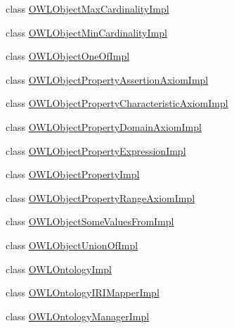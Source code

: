 \begin{DoxyCompactItemize}
\item 
class \hyperlink{classuk_1_1ac_1_1manchester_1_1cs_1_1owl_1_1owlapi_1_1_o_w_l_object_max_cardinality_impl}{O\-W\-L\-Object\-Max\-Cardinality\-Impl}
\item 
class \hyperlink{classuk_1_1ac_1_1manchester_1_1cs_1_1owl_1_1owlapi_1_1_o_w_l_object_min_cardinality_impl}{O\-W\-L\-Object\-Min\-Cardinality\-Impl}
\item 
class \hyperlink{classuk_1_1ac_1_1manchester_1_1cs_1_1owl_1_1owlapi_1_1_o_w_l_object_one_of_impl}{O\-W\-L\-Object\-One\-Of\-Impl}
\item 
class \hyperlink{classuk_1_1ac_1_1manchester_1_1cs_1_1owl_1_1owlapi_1_1_o_w_l_object_property_assertion_axiom_impl}{O\-W\-L\-Object\-Property\-Assertion\-Axiom\-Impl}
\item 
class \hyperlink{classuk_1_1ac_1_1manchester_1_1cs_1_1owl_1_1owlapi_1_1_o_w_l_object_property_characteristic_axiom_impl}{O\-W\-L\-Object\-Property\-Characteristic\-Axiom\-Impl}
\item 
class \hyperlink{classuk_1_1ac_1_1manchester_1_1cs_1_1owl_1_1owlapi_1_1_o_w_l_object_property_domain_axiom_impl}{O\-W\-L\-Object\-Property\-Domain\-Axiom\-Impl}
\item 
class \hyperlink{classuk_1_1ac_1_1manchester_1_1cs_1_1owl_1_1owlapi_1_1_o_w_l_object_property_expression_impl}{O\-W\-L\-Object\-Property\-Expression\-Impl}
\item 
class \hyperlink{classuk_1_1ac_1_1manchester_1_1cs_1_1owl_1_1owlapi_1_1_o_w_l_object_property_impl}{O\-W\-L\-Object\-Property\-Impl}
\item 
class \hyperlink{classuk_1_1ac_1_1manchester_1_1cs_1_1owl_1_1owlapi_1_1_o_w_l_object_property_range_axiom_impl}{O\-W\-L\-Object\-Property\-Range\-Axiom\-Impl}
\item 
class \hyperlink{classuk_1_1ac_1_1manchester_1_1cs_1_1owl_1_1owlapi_1_1_o_w_l_object_some_values_from_impl}{O\-W\-L\-Object\-Some\-Values\-From\-Impl}
\item 
class \hyperlink{classuk_1_1ac_1_1manchester_1_1cs_1_1owl_1_1owlapi_1_1_o_w_l_object_union_of_impl}{O\-W\-L\-Object\-Union\-Of\-Impl}
\item 
class \hyperlink{classuk_1_1ac_1_1manchester_1_1cs_1_1owl_1_1owlapi_1_1_o_w_l_ontology_impl}{O\-W\-L\-Ontology\-Impl}
\item 
class \hyperlink{classuk_1_1ac_1_1manchester_1_1cs_1_1owl_1_1owlapi_1_1_o_w_l_ontology_i_r_i_mapper_impl}{O\-W\-L\-Ontology\-I\-R\-I\-Mapper\-Impl}
\item 
class \hyperlink{classuk_1_1ac_1_1manchester_1_1cs_1_1owl_1_1owlapi_1_1_o_w_l_ontology_manager_impl}{O\-W\-L\-Ontology\-Manager\-Impl}

\end{DoxyCompactItemize}
